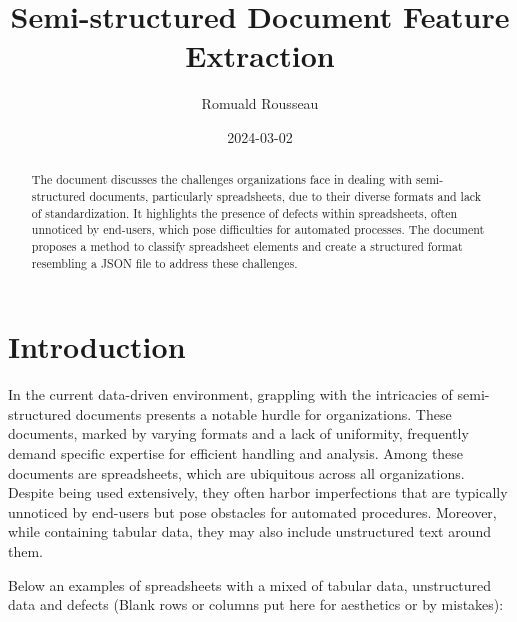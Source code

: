 \documentclass{article}
\title{Semi-structured Document Feature Extraction}
\author{Romuald Rousseau}
\date{ 2024-03-02 }
\begin{document}
\maketitle

\begin{abstract}
    The document discusses the challenges organizations face in dealing with semi-structured documents, particularly
    spreadsheets, due to their diverse formats and lack of standardization. It highlights the presence of defects within
    spreadsheets, often unnoticed by end-users, which pose difficulties for automated processes. The document proposes a
    method to classify spreadsheet elements and create a structured format resembling a JSON file to address these
    challenges.
\end{abstract}

\section{Introduction}
In the current data-driven environment, grappling with the intricacies of semi-structured documents presents a notable
hurdle for organizations. These documents, marked by varying formats and a lack of uniformity, frequently demand
specific expertise for efficient handling and analysis. Among these documents are spreadsheets, which are ubiquitous
across all organizations. Despite being used extensively, they often harbor imperfections that are typically unnoticed
by end-users but pose obstacles for automated procedures. Moreover, while containing tabular data, they may also include
unstructured text around them.

Below an examples of spreadsheets with a mixed of tabular data, unstructured data and defects (Blank rows or columns put
here for aesthetics or by mistakes):
\end{document}
